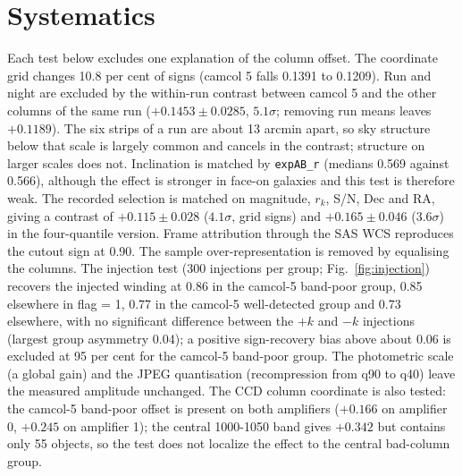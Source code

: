 \documentclass[linenumbers]{aa}
\begin{document}
\section{Systematics}
Each test below excludes one explanation of the column offset. The coordinate grid changes 10.8 per
cent of signs (camcol 5 falls 0.1391 to 0.1209). Run and night are excluded by the within-run contrast between camcol 5 and the other columns of the
same run ($+0.1453 \pm 0.0285$, $5.1\sigma$; removing run means leaves $+0.1189$). The six strips of a
run are about 13 arcmin apart, so sky structure below that scale is largely common and cancels in
the contrast; structure on larger scales does not. Inclination is matched by \texttt{expAB\_r} (medians
0.569 against 0.566), although the effect is stronger in face-on galaxies and this test is
therefore weak. The recorded selection is matched on magnitude, $r_k$, S/N, Dec and RA, giving a
contrast of $+0.115 \pm 0.028$ ($4.1\sigma$, grid signs) and $+0.165 \pm 0.046$ ($3.6\sigma$) in the
four-quantile version. Frame attribution through the SAS WCS reproduces the cutout sign at 0.90.
The sample over-representation is removed by equalising the columns. The injection test (300 injections per group; Fig.~\ref{fig:injection}) recovers the injected
winding at 0.86 in the camcol-5 band-poor group, 0.85 elsewhere in flag = 1, 0.77 in the camcol-5
well-detected group and 0.73 elsewhere, with no significant difference between the $+k$ and $-k$
injections (largest group asymmetry 0.04); a positive sign-recovery bias above about 0.06 is
excluded at 95 per cent for the camcol-5 band-poor group. The photometric scale (a global gain) and the JPEG quantisation (recompression from q90 to
q40) leave the measured amplitude unchanged. The CCD column coordinate is also tested: the camcol-5 band-poor offset is present on both
amplifiers ($+0.166$ on amplifier 0, $+0.245$ on amplifier 1); the central 1000-1050 band gives
$+0.342$ but contains only 55 objects, so the test does not localize the effect to the central
bad-column group.
\end{document}
